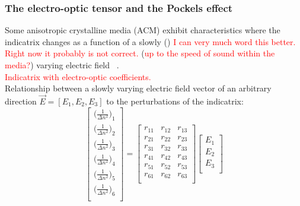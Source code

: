 \subsubsection{The electro-optic tensor and the Pockels effect}
Some anisotropic crystalline media (ACM) exhibit characteristics where the indicatrix changes as a function of a slowly () \textcolor{red}{I can very much word this better. Right now it probably is not correct.} (\textcolor{red}{up to the speed of sound within the media?}) varying electric field ~\cite{yariv,nye}.
\\
\textcolor{red}{Indicatrix with electro-optic coefficients.}
\\
Relationship between a slowly varying electric field vector of an arbitrary direction $\vec{E} = [E_1, E_2, E_3]$ to the perturbations of the indicatrix:
\\
\begin{equation}
  \left[ {\begin{array}{c}
   \big( \frac{1}{\Delta n ^2 } \big)_1 \\
   \big( \frac{1}{\Delta n ^2 } \big)_2 \\
   \big( \frac{1}{\Delta n ^2 } \big)_3 \\
   \big( \frac{1}{\Delta n ^2 } \big)_4 \\
   \big( \frac{1}{\Delta n ^2 } \big)_5 \\
   \big( \frac{1}{\Delta n ^2 } \big)_6 \\

  \end{array} } \right]
  =
%
 \left[ {\begin{array}{ccc}
   r_{11} & r_{12} & r_{13}\\
   r_{21} & r_{22} & r_{23}\\
   r_{31} & r_{32} & r_{33}\\
   r_{41} & r_{42} & r_{43}\\
   r_{51} & r_{52} & r_{53}\\
   r_{61} & r_{62} & r_{63}\\
  \end{array}} \right]
 \left[{\begin{array}{c}
   E_1\\
   E_2\\
   E_3\\
 \end{array}} \right]
\end{equation}

